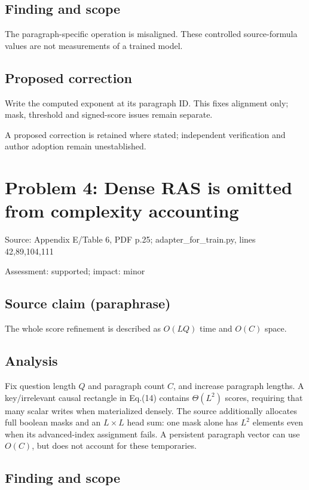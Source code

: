 \documentclass[11pt]{article}
\begin{document}
\subsection*{Finding and scope}

The paragraph-specific operation is misaligned. These controlled source-formula values are not measurements of a trained model.

\subsection*{Proposed correction}

Write the computed exponent at its paragraph ID. This fixes alignment only; mask, threshold and signed-score issues remain separate.

A proposed correction is retained where stated; independent verification and author adoption remain unestablished.

\section*{Problem 4: Dense RAS is omitted from complexity accounting}

Source: Appendix E/Table 6, PDF p.25; adapter\_for\_train.py, lines 42,89,104,111

Assessment: supported; impact: minor

\subsection*{Source claim (paraphrase)}

The whole score refinement is described as \(O(LQ)\) time and \(O(C)\) space.

\subsection*{Analysis}

Fix question length \(Q\) and paragraph count \(C\), and increase paragraph lengths. A key/irrelevant causal rectangle in Eq.(14) contains \(\Theta(L^2)\) scores, requiring that many scalar writes when materialized densely. The source additionally allocates full boolean masks and an \(L\times L\) head sum: one mask alone has \(L^2\) elements even when its advanced-index assignment fails. A persistent paragraph vector can use \(O(C)\), but does not account for these temporaries.

\subsection*{Finding and scope}
\end{document}
